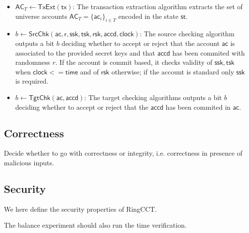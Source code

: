 \begin{definition}
\begin{itemize}
    \item $\mathsf{AC}_T \gets \mathsf{TxExt}(\mathsf{tx})$: The transaction extraction algorithm
    extracts the set of universe accounts $\mathsf{AC}_T = \{\mathsf{ac}_i\}_{i \in T}$ encoded in the state $\mathsf{st}$.
    \item $b \gets \mathsf{SrcChk}(\mathsf{ac,r,ssk,tsk,rsk,accd,clock})$: The source checking algorithm outputs a bit $b$ deciding whether to accept or reject that the account $\mathsf{ac}$ is associated to the provided secret keys and that $\mathsf{accd}$ has been commited with randomness $r$. If the account is commit based, it checks validity of $\mathsf{ssk,tsk}$ when $\mathsf{clock} <= \mathsf{time}$ and of $\mathsf{rsk}$ otherwise; if the account is standard only $\mathsf{ssk}$ is required.
    \item $b \gets \mathsf{TgtChk}(\mathsf{ac,accd})$: The target checking algorithms outputs a bit $b$ deciding whether to accept or reject that the $\mathsf{accd}$ has been commited in $\mathsf{ac}$. 
    \end{itemize}
\end{definition}


\subsection{Correctness}

\begin{todobox}
    Decide whether to go with correctness or integrity, i.e. correctness in presence of malicious inputs.    
\end{todobox}


\subsection{Security}
We here define the security properties of RingCCT.

\begin{todobox}
    The balance experiment should also run the time verification.    
\end{todobox}



